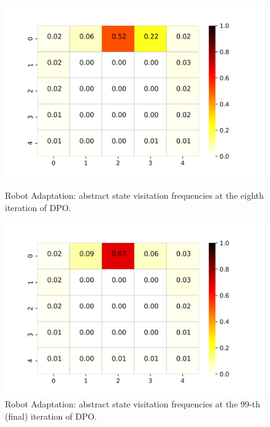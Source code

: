 \begin{figure}[h!]
	\centering
	\begin{minipage}[t]{.45\columnwidth}
		\includegraphics[width=\textwidth]{plots/colormap8.png}
		\caption{Robot Adaptation: abstract state visitation frequencies at the eighth iteration of DPO.}
		\label{fig:cm8}
	\end{minipage}%
	\hfill
	\begin{minipage}[t]{.45\columnwidth}
		\includegraphics[width=\textwidth]{plots/colormap99.png}
		\caption{Robot Adaptation: abstract state visitation frequencies at the $99$-th (final) iteration of DPO.}
		\label{fig:cm99}
	\end{minipage}
\end{figure}

